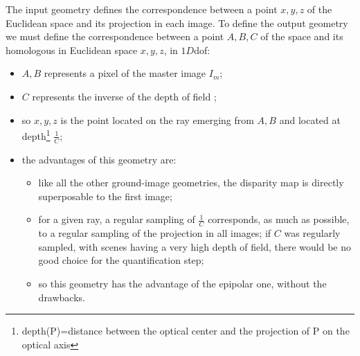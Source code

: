 The input geometry defines the correspondence between a point $x,y,z$ of
the Euclidean space and its projection in each image. To define the output
geometry we must define the correspondence between a point $A,B,C$ of
the  space and its homologous in Euclidean space $x,y,z$, in $1D$dof:

\begin{itemize}
   \item  $A,B$ represents a pixel of the master image $I_m$;
   \item  $C$ represents the inverse of the depth of field ;
   \item so $x,y,z$ is the point located on the ray emerging from $A,B$ and
         located at depth\footnote{depth(P)=distance between the optical center and the projection of P on the optical axis} $\frac1C$;
   \item the advantages of this geometry are:
\begin{itemize}
   \item like all the other ground-image geometries, the disparity map is directly superposable to
          the first image;
   \item for a given ray, a regular sampling of  $\frac1C$ corresponds, as much as possible, to a regular sampling
         of the projection in all images; if $C$ was regularly sampled, with scenes having a very high depth
         of field, there would be no good choice for the quantification step;
    \item so this geometry has the advantage of the epipolar one, without the drawbacks.
\end{itemize}
\end{itemize}



